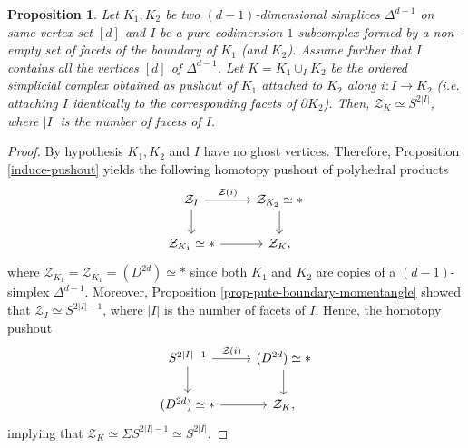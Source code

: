 \documentclass[a4paper,11pt]{article}
\newtheorem{proposition}[theorem]{Proposition}
\theoremstyle{definition}
\newcommand{\ZZ}{\mathcal{Z}}
\begin{document}
\begin{proposition}\label{push-glue}
	Let $K_1,K_2$ be two $(d-1)$-dimensional simplices $\Delta^{d-1}$ on same vertex set $[d]$ and $I$ be a pure codimension $1$ subcomplex formed by a non-empty set of facets of the boundary of $K_1$ (and $K_2$). Assume further that $I$ contains all the vertices $[d]$ of $\Delta^{d-1}$. Let $K = K_1 \cup_I K_2$ be the ordered simplicial complex obtained as pushout of $K_1$ attached to $K_2$ along $i: I \to K_2$ (i.e. attaching $I$ identically to the corresponding facets of $\partial K_2$). Then, $\ZZ_K \simeq S^{2|I|}$, where $|I|$ is the number of facets of $I$. 
\end{proposition}
\begin{proof}
	By hypothesis $K_1,K_2$ and $I$ have no ghost vertices. Therefore, Proposition \ref{induce-pushout} yields the following homotopy pushout of polyhedral products
	\[
	\begin{tikzcd}
		\ZZ_{I}\arrow[r, "\ZZ(i)"] \arrow[d] & \ZZ_{K_2} \simeq * \arrow[d] \\
		\ZZ_{K_1} \simeq * \arrow[r]  & \ZZ_{K},
	\end{tikzcd}
	\]
	where $\ZZ_{K_1} = \ZZ_{K_1} = (D^{2d}) \simeq *$ since both $K_1$ and $K_2$ are copies of a $(d-1)$-simplex $\Delta^{d-1}$. Moreover, Proposition \ref{prop-pute-boundary-momentangle} showed that $\ZZ_{I} \simeq S^{2|I|-1}$, where $|I|$ is the number of facets of $I$.
 	Hence, the homotopy pushout
	\[
	\begin{tikzcd}
		S^{2|I| -1}\arrow[r, "\ZZ(i)"] \arrow[d] &  (D^{2d}) \simeq * \arrow[d] \\
		(D^{2d}) \simeq *  \arrow[r]  & \ZZ_{K},
	\end{tikzcd}
	\]
     implying that $\ZZ_{K} \simeq \Sigma S^{2|I| -1} \simeq S^{2|I|}$.	
\end{proof}
\end{document}
